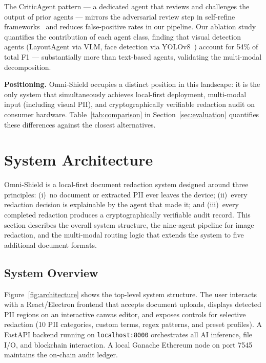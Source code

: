 \documentclass[conference]{IEEEtran}
\begin{document}
The CriticAgent pattern --- a dedicated agent that
reviews and challenges the output of prior agents ---
mirrors the adversarial review step in self-refine
frameworks~\cite{madaan2023selfrefine} and reduces
false-positive rates in our pipeline.
Our ablation study quantifies the contribution of
each agent class, finding that visual detection
agents (LayoutAgent via VLM, face detection via
YOLOv8~\cite{redmon2016yolo}) account for 54\% of
total F1 --- substantially more than text-based
agents, validating the multi-modal decomposition.

\vspace{6pt}
\noindent\textbf{Positioning.}
Omni-Shield occupies a distinct position in this
landscape: it is the only system that simultaneously
achieves local-first deployment, multi-modal input
(including visual PII), and cryptographically
verifiable redaction audit on consumer hardware.
Table~\ref{tab:comparison} in Section~\ref{sec:evaluation}
quantifies these differences against the closest
alternatives.

\section{System Architecture}
\label{sec:architecture}

Omni-Shield is a local-first document redaction system
designed around three principles:
(i)~no document or extracted PII ever leaves the
device;
(ii)~every redaction decision is explainable by the
agent that made it;
and (iii)~every completed redaction produces a
cryptographically verifiable audit record.
This section describes the overall system structure,
the nine-agent pipeline for image redaction, and the
multi-modal routing logic that extends the system to
five additional document formats.

\subsection{System Overview}

Figure~\ref{fig:architecture} shows the top-level
system structure.
The user interacts with a React/Electron frontend that
accepts document uploads, displays detected PII regions
on an interactive canvas editor, and exposes controls
for selective redaction (10 PII categories, custom
terms, regex patterns, and preset profiles).
A FastAPI backend running on \texttt{localhost:8000}
orchestrates all AI inference, file I/O, and blockchain
interaction.
A local Ganache Ethereum node on port 7545 maintains
the on-chain audit ledger.
\end{document}
